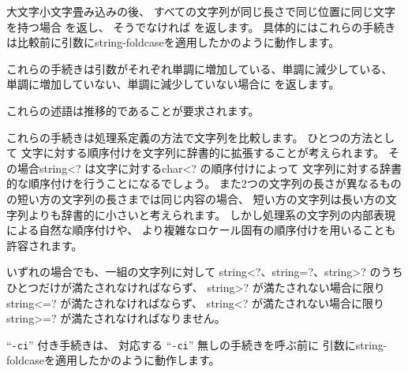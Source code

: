 \begin{entry}{%
}

大文字小文字畳み込みの後、
すべての文字列が同じ長さで同じ位置に同じ文字を持つ場合 \schtrue{}を返し、
そうでなければ \schfalse{}を返します。
具体的にはこれらの手続きは比較前に引数に{\cf string-foldcase}を適用したかのように動作します。

\end{entry}


\begin{entry}{%
}

これらの手続きは引数がそれぞれ単調に増加している、単調に減少している、
単調に増加していない、単調に減少していない場合に \schtrue{}を返します。

これらの述語は推移的であることが要求されます。

これらの手続きは処理系定義の方法で文字列を比較します。
ひとつの方法として
文字に対する順序付けを文字列に辞書的に拡張することが考えられます。
その場合{\cf string<?} は文字に対する{\cf char<?} の順序付けによって
文字列に対する辞書的な順序付けを行うことになるでしょう。
また2つの文字列の長さが異なるものの短い方の文字列の長さまでは同じ内容の場合、
短い方の文字列は長い方の文字列よりも辞書的に小さいと考えられます。
しかし処理系の文字列の内部表現による自然な順序付けや、
より複雑なロケール固有の順序付けを用いることも許容されます。

いずれの場合でも、一組の文字列に対して
{\cf string<?}、{\cf string=?}、{\cf string>?}
のうちひとつだけが満たされなければならず、
{\cf string>?} が満たされない場合に限り{\cf string<=?} が満たされなければならず、
{\cf string<?} が満たされない場合に限り{\cf string>=?} が満たされなければなりません。

``{\tt -ci}'' 付き手続きは、
対応する ``{\tt -ci}'' 無しの手続きを呼ぶ前に
引数に{\cf string-foldcase}を適用したかのように動作します。


\end{entry}

